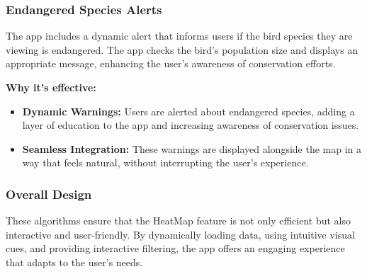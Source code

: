 \documentclass{article}
\begin{document}
\subsubsection{Endangered Species Alerts}
The app includes a dynamic alert that informs users if the bird species they are viewing is endangered. The app checks the bird's population size and displays an appropriate message, enhancing the user's awareness of conservation efforts.

\textbf{Why it's effective:}
\begin{itemize}
    \item \textbf{Dynamic Warnings:} Users are alerted about endangered species, adding a layer of education to the app and increasing awareness of conservation issues.
    \item \textbf{Seamless Integration:} These warnings are displayed alongside the map in a way that feels natural, without interrupting the user's experience.
\end{itemize}

\subsubsection{Overall Design}
These algorithms ensure that the HeatMap feature is not only efficient but also interactive and user-friendly. By dynamically loading data, using intuitive visual cues, and providing interactive filtering, the app offers an engaging experience that adapts to the user's needs.
\end{document}
